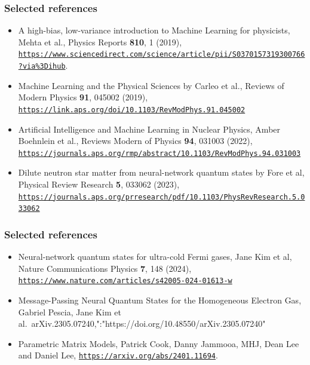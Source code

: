 \documentclass{beamer}
\begin{document}
\begin{frame}
\frametitle{Selected references}

\begin{block}{}
\begin{itemize}
\item A high-bias, low-variance introduction to Machine Learning for physicists, Mehta et al., Physics Reports \textbf{810}, 1 (2019), \href{{https://www.sciencedirect.com/science/article/pii/S0370157319300766?via%3Dihub}}{\nolinkurl{https://www.sciencedirect.com/science/article/pii/S0370157319300766?via\%3Dihub}}.

\item Machine Learning and the Physical Sciences by Carleo et al., Reviews of Modern Physics \textbf{91}, 045002 (2019), \href{{https://link.aps.org/doi/10.1103/RevModPhys.91.045002}}{\nolinkurl{https://link.aps.org/doi/10.1103/RevModPhys.91.045002}}

\item Artificial Intelligence and Machine Learning in Nuclear Physics, Amber Boehnlein et al., Reviews Modern of Physics \textbf{94}, 031003 (2022), \href{{https://journals.aps.org/rmp/abstract/10.1103/RevModPhys.94.031003}}{\nolinkurl{https://journals.aps.org/rmp/abstract/10.1103/RevModPhys.94.031003}} 

\item Dilute neutron star matter from neural-network quantum states by Fore et al, Physical Review Research \textbf{5}, 033062 (2023), \href{{https://journals.aps.org/prresearch/pdf/10.1103/PhysRevResearch.5.033062}}{\nolinkurl{https://journals.aps.org/prresearch/pdf/10.1103/PhysRevResearch.5.033062}}
\end{itemize}

\noindent
\end{block}
\end{frame}

\begin{frame}
\frametitle{Selected references}

\begin{block}{}
\begin{itemize}
\item Neural-network quantum states for ultra-cold Fermi gases, Jane Kim et al, Nature Communications Physics \textbf{7}, 148 (2024), \href{{https://www.nature.com/articles/s42005-024-01613-w}}{\nolinkurl{https://www.nature.com/articles/s42005-024-01613-w}}

\item Message-Passing Neural Quantum States for the Homogeneous Electron Gas, Gabriel Pescia, Jane Kim et al.~arXiv.2305.07240,":"https://doi.org/10.48550/arXiv.2305.07240"

\item Parametric Matrix Models, Patrick Cook, Danny Jammooa, MHJ, Dean Lee and Daniel Lee, \href{{https://arxiv.org/abs/2401.11694}}{\nolinkurl{https://arxiv.org/abs/2401.11694}}. 
\end{itemize}

\noindent
\end{block}
\end{frame}
\end{document}
